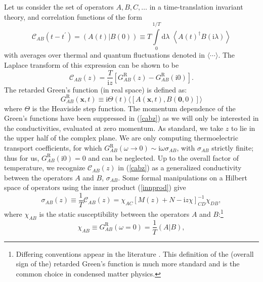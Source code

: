 \documentclass[10pt, oneside]{book}
\begin{document}
\begin{doublespace}
   Let us consider the set of operators $A,B,C,\ldots$ in a time-translation invariant theory, and correlation functions of the form \begin{equation}
\mathcal{C}_{AB}(t-t^\prime) = (A(t)|B(0)) \equiv T\int\limits_0^{1/T}\mathrm{d}\lambda\; \left\langle A(t)^\dagger B(\mathrm{i}\lambda)\right\rangle  \label{innprod}
\end{equation}with averages over thermal and quantum fluctuations denoted in $\langle \cdots\rangle$.   The Laplace transform of this expression can be shown to be \begin{equation}
\mathcal{C}_{AB}(z) = \frac{T}{\mathrm{i}z}\left[G^{\mathrm{R}}_{AB}(z) - G^{\mathrm{R}}_{AB}(\mathrm{i}0)\right].  \label{cabz}
\end{equation}The retarded Green's function (in real space) is defined as: \begin{equation}
G^{\mathrm{R}}_{AB}(\mathbf{x},t) \equiv \mathrm{i}\Theta(t) \langle  [A(\mathbf{x},t),B(\mathbf{0},0)]\rangle
\end{equation}
where $\Theta$ is the Heaviside step function.  The momentum dependence of the Green's functions have been suppressed in (\ref{cabz}) as we will only be interested in the conductivities, evaluated at zero momentum.  As standard, we take $z$ to lie in the upper half of the complex plane.  We are only computing thermoelectric transport coefficients, for which $G^{\mathrm{R}}_{AB}(\omega \rightarrow 0) \sim \mathrm{i}\omega \sigma_{AB}$, with $\sigma_{AB}$ strictly finite;  thus for us, $G^{\mathrm{R}}_{AB}(\mathrm{i}0)=0$ and can be neglected.   Up to the overall factor of temperature, we recognize $\mathcal{C}_{AB}(z)$ in (\ref{cabz}) as a generalized conductivity between the operators $A$ and $B$, $\sigma_{AB}$.   Some formal manipulations on a Hilbert space of operators using the inner product (\ref{innprod}) give  \begin{equation}
\sigma_{AB}(z) \equiv \frac{1}{T}\mathcal{C}_{AB}(z) = \chi_{AC}[M(z)+N-\mathrm{i}z \chi]^{-1}_{CD}\chi_{DB},  \label{mmf}
\end{equation}where $\chi_{AB}$ is the static susceptibility between the operators $A$ and $B$:\footnote{Differing conventions appear in the literature \cite{Kovtun:2012rj}.   This definition of the (overall sign of the) retarded Green's function is much more standard \cite{Hartnoll:2012rj, Davison:2013txa} and is the common choice in condensed matter physics.}
\begin{equation}
\chi_{AB} \equiv G^{\mathrm{R}}_{AB}(\omega=0) = \frac{1}{T} (A|B),   \label{chiab}

\end{equation}
\end{doublespace}
\end{document}
